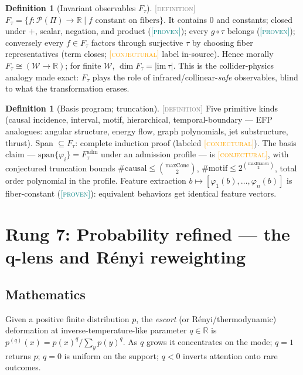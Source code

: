 \documentclass[11pt]{article}
\newcommand{\PROVEN}{\textcolor{teal}{\textsc{[proven]}}}
\newcommand{\DEFINITION}{\textcolor{gray}{\textsc{[definition]}}}
\newcommand{\CONJECTURAL}{\textcolor{orange}{\textsc{[conjectural]}}}
\newcommand{\PT}{\Pi}
\newcommand{\PS}{\mathcal{P}(\PT)}
\newcommand{\WS}{\mathcal{W}}
\newcommand{\R}{\mathbb{R}}
\theoremstyle{plain}
\theoremstyle{definition}
\newtheorem{definition}[theorem]{Definition}
\theoremstyle{remark}
\begin{document}
\begin{definition}[Invariant observables $F_\tau$]\DEFINITION\;
$F_\tau = \{f : \PS \to \R \mid f \text{ constant on fibers}\}$. It
contains $0$ and constants; closed under $+$, scalar, negation, and
product (\PROVEN); every $g \circ \tau$ belongs (\PROVEN); conversely
every $f \in F_\tau$ factors through surjective $\tau$ by choosing fiber
representatives (term closes; \CONJECTURAL{} label in-source). Hence
morally $F_\tau \cong (\WS \to \R)$; for finite $\WS$,
$\dim F_\tau = |\mathrm{im}\,\tau|$. This is the collider-physics analogy
made exact: $F_\tau$ plays the role of infrared/collinear-\emph{safe}
observables, blind to what the transformation erases.
\end{definition}

\begin{definition}[Basis program; truncation]\DEFINITION\;
Five primitive kinds (causal incidence, interval, motif, hierarchical,
temporal-boundary --- EFP analogues: angular structure, energy flow, graph
polynomials, jet substructure, thrust). Span $\subseteq F_\tau$: complete
induction proof (labeled \CONJECTURAL). The basis claim ---
$\mathrm{span}\{\varphi_i\} = F^{\mathrm{adm}}_\tau$ under an admission
profile --- is \CONJECTURAL, with conjectured truncation bounds
$\#\mathrm{causal} \le \binom{\mathrm{maxConc}}{2}$,
$\#\mathrm{motif} \le 2^{\binom{\mathrm{maxBranch}}{2}}$, total order
polynomial in the profile. Feature extraction
$b \mapsto [\varphi_1(b), \dots, \varphi_n(b)]$ is fiber-constant
(\PROVEN): equivalent behaviors get identical feature vectors.
\end{definition}

\section{Rung 7: Probability refined --- the q-lens and R\'enyi reweighting}
\label{sec:rung7}

\subsection{Mathematics}
Given a positive finite distribution $p$, the \emph{escort} (or
R\'enyi/thermodynamic) deformation at inverse-temperature-like parameter
$q \in \R$ is $p^{(q)}(x) = p(x)^q / \sum_y p(y)^q$. As $q$ grows it
concentrates on the mode; $q = 1$ returns $p$; $q = 0$ is uniform on the
support; $q < 0$ inverts attention onto rare outcomes.
\end{document}

